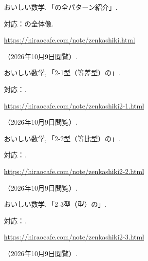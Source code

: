   \begin{enumerate}[resume,label={[\arabic*]}]
    \item \begin{minipage}[t]{\linewidth}\raggedright
        おいしい数学,\,「の全パターン紹介」.
        \par{\small 対応：の全体像.\par}
        \par\noindent\url{https://hiraocafe.com/note/zenkashiki.html}\par
        \noindent（2026年10月9日閲覧）.
      \end{minipage}\par\smallskip

    \item \begin{minipage}[t]{\linewidth}\raggedright
        おいしい数学,\,「2-1型（等差型）の」.
        \par{\small 対応：.\par}
        \par\noindent\url{https://hiraocafe.com/note/zenkashiki2-1.html}\par
        \noindent（2026年10月9日閲覧）.
      \end{minipage}\par\smallskip

    \item \begin{minipage}[t]{\linewidth}\raggedright
        おいしい数学,\,「2-2型（等比型）の」.
        \par{\small 対応：.\par}
        \par\noindent\url{https://hiraocafe.com/note/zenkashiki2-2.html}\par
        \noindent（2026年10月9日閲覧）.
      \end{minipage}\par\smallskip

    \item \begin{minipage}[t]{\linewidth}\raggedright
        おいしい数学,\,「2-3型（型）の」.
        \par{\small 対応：.\par}
        \par\noindent\url{https://hiraocafe.com/note/zenkashiki2-3.html}\par
        \noindent（2026年10月9日閲覧）.
      \end{minipage}\par\smallskip


\end{enumerate}
